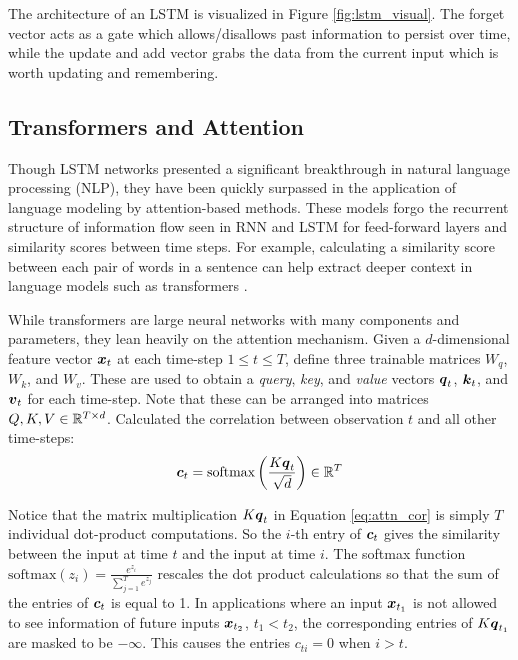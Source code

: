 The architecture of an LSTM is visualized in Figure \ref{fig:lstm_visual}. The forget vector acts as a gate which allows/disallows past information to persist over time, while the update and add vector grabs the data from the current input which is worth updating and remembering.


\subsection{Transformers and Attention}
Though LSTM networks presented a significant breakthrough in natural language processing (NLP), they have been quickly surpassed in the application of language modeling by attention-based methods. These models forgo the recurrent structure of information flow seen in RNN and LSTM for feed-forward layers and similarity scores between time steps. For example, calculating a similarity score between each pair of words in a sentence can help extract deeper context in language models such as transformers \cite{vaswani2017}.

While transformers are large neural networks with many components and parameters, they lean heavily on the attention mechanism. Given a $d$-dimensional feature vector $\boldsymbol{x}_t$ at each time-step $1\leq t\leq T$, define three trainable matrices $W_q$, $W_k$, and $W_v$. These are used to obtain a \textit{query}, \textit{key}, and \textit{value} vectors $\boldsymbol{q}_t$, $\boldsymbol{k}_t$, and $\boldsymbol{v}_t$ for each time-step. Note that these can be arranged into matrices $Q,K,V \in \mathbb{R}^{T\times d}$. Calculated the correlation between observation $t$ and all other time-steps:
\begin{equation}
  \boldsymbol{c}_t = \text{softmax}\left(\frac{K \boldsymbol{q}_t}{\sqrt{d}} \right) \in \mathbb{R}^T
  \label{eq:attn_cor}
\end{equation}


Notice that the matrix multiplication $K \boldsymbol{q}_t$ in Equation \ref{eq:attn_cor} is simply $T$ individual dot-product computations. So the $i$-th entry of $\boldsymbol{c}_t$ gives the similarity between the input at time $t$ and the input at time $i$. The softmax function $\text{softmax}(z_i) = \frac{e^{z_i}}{\sum_{j=1}^T e^{z_j}}$ rescales the dot product calculations so that the sum of the entries of $\boldsymbol{c}_t$ is equal to 1. In applications where an input $\boldsymbol{x}_{t_1}$ is not allowed to see information of future inputs $\boldsymbol{x}_{t_2}$, $t_1<t_2$, the corresponding entries of $K\boldsymbol{q}_{t_1}$ are masked to be $-\infty$. This causes the entries $c_{ti} = 0$ when $i > t$.

